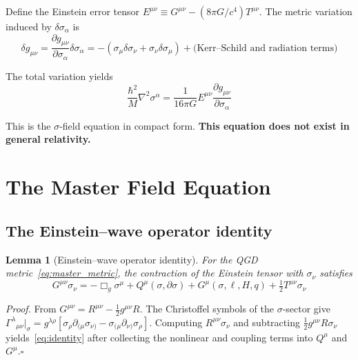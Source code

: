 \documentclass[11pt,a4paper]{article}
\theoremstyle{plain}
\newtheorem{lemma}[theorem]{Lemma}
\theoremstyle{definition}
\theoremstyle{remark}
\begin{document}
Define the Einstein error tensor $E^{\mu\nu} \equiv G^{\mu\nu} - (8\pi G/c^4)T^{\mu\nu}$.  The metric variation induced by $\delta\sigma_\alpha$ is
\begin{equation}
  \delta g_{\mu\nu} = \frac{\partial g_{\mu\nu}}{\partial\sigma_\alpha}\delta\sigma_\alpha = -(\sigma_\mu\delta\sigma_\nu + \sigma_\nu\delta\sigma_\mu) + \text{(Kerr--Schild and radiation terms)}
\end{equation}

The total variation yields
\begin{equation}
  \boxed{\frac{\hbar^2}{M}\nabla^2\sigma^\alpha = \frac{1}{16\pi G}E^{\mu\nu}\frac{\partial g_{\mu\nu}}{\partial\sigma_\alpha}}
  \label{eq:compact}
\end{equation}

This is the $\sigma$-field equation in compact form.  \textbf{This equation does not exist in general relativity.}

\section{The Master Field Equation}
\label{sec:master_eq}

\subsection{The Einstein--wave operator identity}

\begin{lemma}[Einstein--wave operator identity]\label{lem:identity}
  For the QGD metric~\eqref{eq:master_metric}, the contraction of the Einstein tensor with $\sigma_\nu$ satisfies
  \begin{equation}
    G^{\mu\nu}\sigma_\nu = -\Box_g\sigma^\mu + Q^\mu(\sigma,\partial\sigma) + G^\mu(\sigma,\ell,H,q) + \tfrac{1}{2}T^{\mu\nu}\sigma_\nu
    \label{eq:identity}
  \end{equation}
\end{lemma}

\emph{Proof.}  From $G^{\mu\nu} = R^{\mu\nu} - \tfrac{1}{2}g^{\mu\nu}R$.  The Christoffel symbols of the $\sigma$-sector give $\Gamma^\lambda{}_{\mu\nu}|_\sigma = g^{\lambda\rho}[\sigma_\rho\partial_{(\mu}\sigma_{\nu)} - \sigma_{(\mu}\partial_{\nu)}\sigma_\rho]$.  Computing $R^{\mu\nu}\sigma_\nu$ and subtracting $\tfrac{1}{2}g^{\mu\nu}R\sigma_\nu$ yields~\eqref{eq:identity} after collecting the nonlinear and coupling terms into $Q^\mu$ and $G^\mu$.\hfill$\square$
\end{document}
